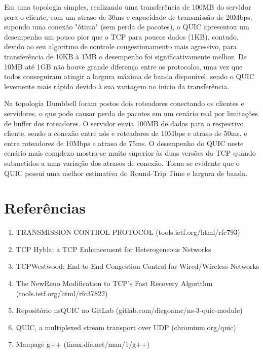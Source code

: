 \documentclass{article}
\begin{document}
Em uma topologia simples, realizando uma transferência de 100MB do servidor para o cliente, com um atraso de 30ms e capacidade
de transmissão de 20Mbps, supondo uma conexão "ótima" (sem perda de pacotes), o QUIC apresentou um desempenho um pouco
pior que o TCP para poucos dados (1KB), contudo, devido ao seu algoritmo de controle congestionamento mais agressivo,
para transferência de 10KB à 1MB o desempenho foi significativamente melhor. De 10MB até 1GB não houve grande diferença entre
os protocolos, uma vez que todos conseguiram atingir a largura máxima de banda disponível, sendo o QUIC levemente mais
rápido devido à sua vantagem no início da transferência.

Na topologia Dumbbell foram postos dois roteadores conectando os clientes e servidores, o que pode causar perda de
pacotes em um cenário real por limitações de buffer dos roteadores. O servidor envia 100MB de dados para o respectivo cliente, sendo a
conexão entre nós e roteadores de 10Mbps e atraso de 50ms, e entre roteadores de 10Mbps e atraso de 75ms. O desempenho
do QUIC neste cenário mais complexo mostra-se muito superior às duas versões do TCP quando submetidos a uma variação dos
atrasos de conexão. Torna-se evidente que o QUIC possui uma melhor estimativa do Round-Trip Time e largura de banda.
\section{Referências}
\begin{enumerate}
\item TRANSMISSION CONTROL PROTOCOL (tools.ietf.org/html/rfc793)
\item TCP Hybla: a TCP Enhancement for Heterogeneous Networks
\item TCPWestwood:  End-to-End Congestion Control for Wired/Wireless Networks
\item The NewReno Modification to TCP's Fast Recovery Algorithm (tools.ietf.org/html/rfc37822)
\item Repositório nsQUIC no GitLab (gitlab.com/diegoamc/ns-3-quic-module)
\item QUIC, a multiplexed stream transport over UDP (chromium.org/quic)
\item Manpage g++ (linux.die.net/man/1/g++)
\end{enumerate}
\end{document}
